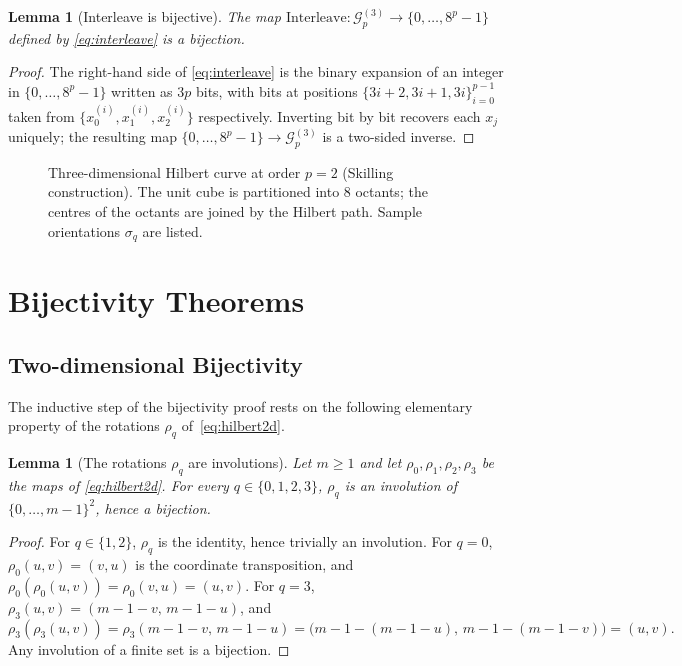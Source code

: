 \documentclass[11pt,a4paper]{article}
\theoremstyle{plain}
\newtheorem{lemma}[theorem]{Lemma}
\theoremstyle{definition}
\theoremstyle{remark}
\newcommand{\Grid}{\mathcal{G}}
\begin{document}
\begin{lemma}[Interleave is bijective]\label{lem:interleave}
The map $\mathrm{Interleave}:\Grid_p^{(3)}\to\{0,\dots,8^p-1\}$ defined by
\eqref{eq:interleave} is a bijection.
\end{lemma}

\begin{proof}
The right-hand side of \eqref{eq:interleave} is the binary expansion of
an integer in $\{0,\dots,8^p-1\}$ written as $3p$ bits, with bits at
positions $\{3i+2,3i+1,3i\}_{i=0}^{p-1}$ taken from
$\{x_0^{(i)},x_1^{(i)},x_2^{(i)}\}$ respectively. Inverting bit by bit
recovers each $x_j$ uniquely; the resulting map
$\{0,\dots,8^p-1\}\to\Grid_p^{(3)}$ is a two-sided inverse.
\end{proof}

\begin{figure}[!htbp]
  \centering
  
  \caption{Three-dimensional Hilbert curve at order $p=2$ (Skilling
  construction). The unit cube is partitioned into 8 octants; the
  centres of the octants are joined by the Hilbert path. Sample
  orientations $\sigma_q$ are listed.}
  \label{fig:hilbert3d}
\end{figure}

\section{Bijectivity Theorems}\label{sec:bijectivity}

\subsection{Two-dimensional Bijectivity}\label{sec:bij_2d}

The inductive step of the bijectivity proof rests on the following
elementary property of the rotations $\rho_q$ of~\eqref{eq:hilbert2d}.

\begin{lemma}[The rotations $\rho_q$ are involutions]
\label{lem:rho_involutive}
Let $m\geq 1$ and let $\rho_0,\rho_1,\rho_2,\rho_3$ be the maps of
\eqref{eq:hilbert2d}. For every $q\in\{0,1,2,3\}$, $\rho_q$ is an
involution of $\{0,\dots,m-1\}^2$, hence a bijection.
\end{lemma}

\begin{proof}
For $q\in\{1,2\}$, $\rho_q$ is the identity, hence trivially an
involution. For $q=0$, $\rho_0(u,v)=(v,u)$ is the coordinate
transposition, and
$\rho_0(\rho_0(u,v))=\rho_0(v,u)=(u,v)$. For $q=3$,
$\rho_3(u,v)=(m-1-v,\,m-1-u)$, and
\[
\rho_3(\rho_3(u,v))
 = \rho_3(m-1-v,\,m-1-u)
 = \bigl(m-1-(m-1-u),\,m-1-(m-1-v)\bigr)
 = (u,v).
\]
Any involution of a finite set is a bijection.
\end{proof}
\end{document}
